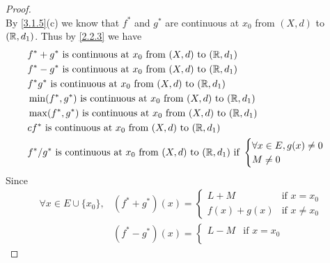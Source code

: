 \begin{proof}
\[  \]
  By \cref{3.1.5}(c) we know that \(f^*\) and \(g^*\) are continuous at \(x_0\) from \((X, d)\) to \((\mathbb{R}, d_1)\).
  Thus by \cref{2.2.3} we have
  \begin{align*}
     & f^* + g^* \text{ is continuous at } x_0 \text{ from } (X, d) \text{ to } (\mathbb{R}, d_1)                                          \\
     & f^* - g^* \text{ is continuous at } x_0 \text{ from } (X, d) \text{ to } (\mathbb{R}, d_1)                                          \\
     & f^* g^* \text{ is continuous at } x_0 \text{ from } (X, d) \text{ to } (\mathbb{R}, d_1)                                            \\
     & \min(f^*, g^*) \text{ is continuous at } x_0 \text{ from } (X, d) \text{ to } (\mathbb{R}, d_1)                                     \\
     & \max(f^*, g^*) \text{ is continuous at } x_0 \text{ from } (X, d) \text{ to } (\mathbb{R}, d_1)                                     \\
     & c f^* \text{ is continuous at } x_0 \text{ from } (X, d) \text{ to } (\mathbb{R}, d_1)                                              \\
     & f^* / g^* \text{ is continuous at } x_0 \text{ from } (X, d) \text{ to } (\mathbb{R}, d_1) \text{ if } \begin{cases}
                                                                                                        \forall x \in E, g(x) \neq 0 \\
                                                                                                        M \neq 0
                                                                                                      \end{cases}
  \end{align*}
  Since
  \begin{align*}
    \forall x \in E \cup \{x_0\}, & (f^* + g^*)(x) = \begin{cases}
                                                       L + M       & \text{if } x = x_0    \\
                                                       f(x) + g(x) & \text{if } x \neq x_0
                                                     \end{cases}                    \\
                                  & (f^* - g^*)(x) = \begin{cases}
                                                       L - M       & \text{if } x = x_0    \\

\end{cases}
\end{align*}
\end{proof}
